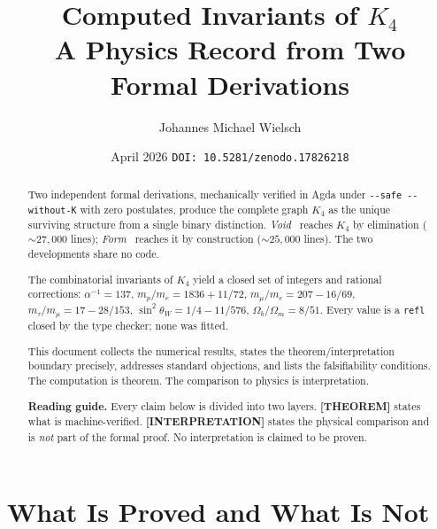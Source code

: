 \documentclass[11pt,a4paper]{article}
\title{%
  Computed Invariants of $K_4$\\[0.3em]
  \large A Physics Record from Two Formal Derivations}
\author{Johannes Michael Wielsch}
\date{April 2026 \quad\texttt{DOI: 10.5281/zenodo.17826218}}
\newcommand{\THEOREM}{\textcolor{blue!70!black}{\textbf{[THEOREM]}}}
\newcommand{\INTERP}{\textcolor{orange!80!black}{\textbf{[INTERPRETATION]}}}
\theoremstyle{definition}
\begin{document}
\maketitle

\begin{abstract}
\noindent
Two independent formal derivations, mechanically verified in Agda under
\texttt{-{}-safe -{}-without-K} with zero postulates, produce the complete
graph $K_4$ as the unique surviving structure from a single binary distinction.
\textit{Void}~\cite{wielsch2026void} reaches $K_4$ by elimination
(${\sim}27{,}000$ lines); \textit{Form}~\cite{wielsch2026form} reaches it
by construction (${\sim}25{,}000$ lines).  The two developments share no code.

The combinatorial invariants of $K_4$ yield a closed set of integers and
rational corrections: $\alpha^{-1} = 137$, $m_p/m_e = 1836 + 11/72$,
$m_\mu/m_e = 207 - 16/69$, $m_\tau/m_\mu = 17 - 28/153$,
$\sin^2\theta_W = 1/4 - 11/576$, $\Omega_b/\Omega_m = 8/51$.
Every value is a \texttt{refl} closed by the type checker; none was fitted.

This document collects the numerical results, states the
theorem/interpretation boundary precisely, addresses standard objections,
and lists the falsifiability conditions.
The computation is theorem.  The comparison to physics is interpretation.

\medskip\noindent
\textbf{Reading guide.}
Every claim below is divided into two layers.  \THEOREM{} states what is
machine-verified.  \INTERP{} states the physical comparison and is
\emph{not} part of the formal proof.  No interpretation is claimed to be
proven.
\end{abstract}

\section{What Is Proved and What Is Not}
\label{sec:boundary}
\end{document}
